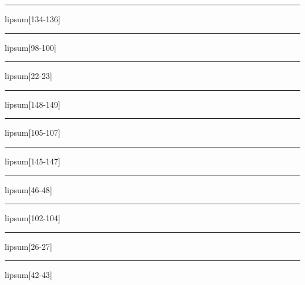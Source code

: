 \documentclass[11pt,a4paper]{article}
\begin{document}
\begin{simplewrap}
  \textcolor{magenta!10}{\rule{5.7cm}{8.2cm}}
\end{simplewrap}
lipsum[134-136]

\begin{simplewrap}
  \textcolor{blue!54}{\rule{4.6cm}{3.8cm}}
\end{simplewrap}
lipsum[98-100]

\begin{simplewrap}
  \textcolor{orange!37}{\rule{3.4cm}{5.8cm}}
\end{simplewrap}
lipsum[22-23]

\begin{simplewrap}
  \textcolor{magenta!36}{\rule{3.8cm}{2.0cm}}
\end{simplewrap}
lipsum[148-149]

\begin{simplewrap}
  \textcolor{cyan!10}{\rule{4.1cm}{3.6cm}}
\end{simplewrap}
lipsum[105-107]

\begin{simplewrap}
  \textcolor{purple!37}{\rule{5.0cm}{4.0cm}}
\end{simplewrap}
lipsum[145-147]

\begin{simplewrap}
  \textcolor{teal!53}{\rule{4.2cm}{3.6cm}}
\end{simplewrap}
lipsum[46-48]

\begin{simplewrap}
  \textcolor{magenta!40}{\rule{3.8cm}{4.5cm}}
\end{simplewrap}
lipsum[102-104]

\begin{simplewrap}
  \textcolor{orange!57}{\rule{3.7cm}{8.3cm}}
\end{simplewrap}
lipsum[26-27]

\begin{simplewrap}
  \textcolor{pink!60}{\rule{4.0cm}{6.4cm}}
\end{simplewrap}
lipsum[42-43]
\end{document}
